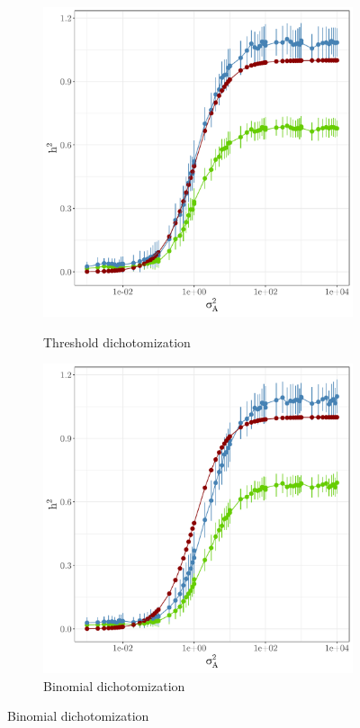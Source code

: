 \begin{figure}
  \centering
  \begin{subfigure}[b]{0.49\textwidth}
    \caption{Threshold dichotomization}
    \includegraphics[width=\textwidth]{figures/simulation_deviance_round.pdf}
    \label{fig:simulation_h2_dev:round}
  \end{subfigure}%
  \begin{subfigure}[b]{0.49\textwidth}
    \caption{Binomial dichotomization}
    \includegraphics[width=\textwidth]{figures/simulation_deviance_binom.pdf}

\end{subfigure}
\end{figure}
